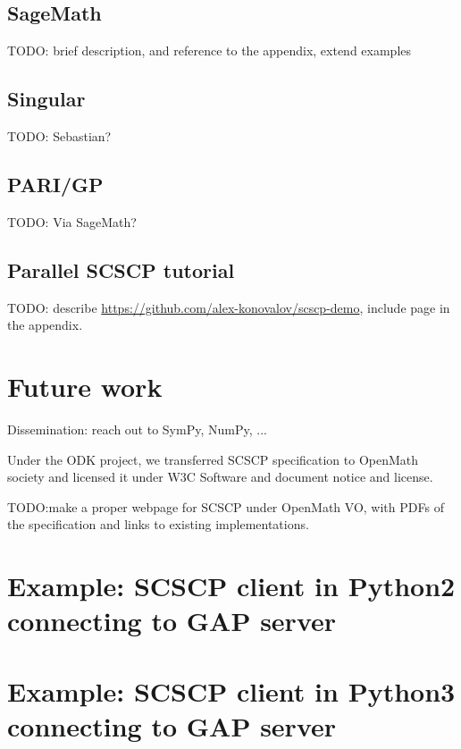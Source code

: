\documentclass{deliverablereport}
\begin{document}
\subsection{SageMath}

TODO: brief description, and reference to the appendix, extend examples


\subsection{Singular}

TODO: Sebastian?


\subsection{PARI/GP}

TODO: Via SageMath?


\subsection{Parallel SCSCP tutorial}

TODO: describe \url{https://github.com/alex-konovalov/scscp-demo},
include page in the appendix.

\section{Future work}

Dissemination: reach out to SymPy, NumPy, ...

Under the ODK project, we transferred SCSCP specification
to OpenMath society and licensed it under
W3C Software and document notice and license.

TODO:make a proper webpage for SCSCP under OpenMath VO, with
PDFs of the specification and links to existing implementations.




\printbibliography

\appendix

\section{Example: SCSCP client in Python2 connecting to GAP server}\label{python2-to-GAP}


\section{Example: SCSCP client in Python3 connecting to GAP server}\label{python3-to-GAP}

\end{document}
